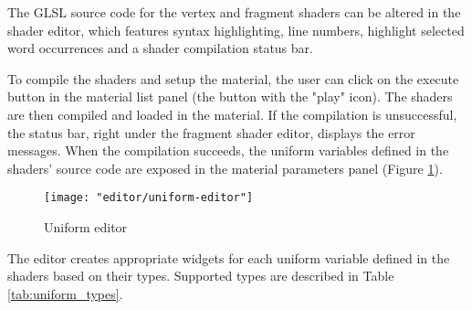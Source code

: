 The GLSL source code for the vertex and fragment shaders can be altered in the shader editor, which features syntax highlighting, line numbers, highlight selected word occurrences and a shader compilation status bar.

To compile the shaders and setup the material, the user can click on the execute button in the material list panel (the button with the "play" icon). The shaders are then compiled and loaded in the material. If the compilation is unsuccessful, the status bar, right under the fragment shader editor, displays the error messages. When the compilation succeeds, the uniform variables defined in the shaders' source code are exposed in the material parameters panel (Figure \ref{fig:uniform-editor}).

\begin{figure}
    \caption{Uniform editor}
    \begin{center}
        \texttt{[image: "editor/uniform-editor"]}
    \end{center}
    \label{fig:uniform-editor}
\end{figure}

The editor creates appropriate widgets for each uniform variable defined in the shaders based on their types. Supported types are described in Table \ref{tab:uniform_types}.

